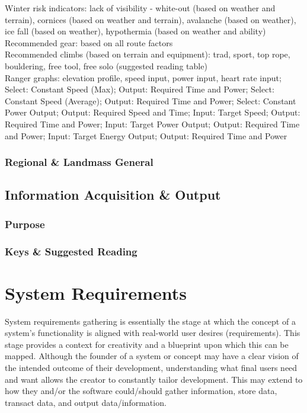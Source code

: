 \documentclass[11pt, english]{article}
\begin{document}
		Winter risk indicators: lack of visibility - white-out (based on weather and terrain), cornices (based on weather and terrain), avalanche (based on weather), ice fall (based on weather), hypothermia (based on weather and ability)\\

		Recommended gear: based on all route factors\\

		Recommended climbs (based on terrain and equipment): trad, sport, top rope, bouldering, free tool, free solo (suggested reading table)\\

		Ranger graphs: elevation profile, speed input, power input, heart rate input; Select: Constant Speed (Max); Output: Required Time and Power; Select: Constant Speed (Average); Output: Required Time and Power; Select: Constant Power Output; Output: Required Speed and Time; Input: Target Speed; Output: Required Time and Power; Input: Target Power Output; Output: Required Time and Power; Input: Target Energy Output; Output: Required Time and Power

		\subsubsection{Regional \& Landmass General}

	\subsection{Information Acquisition \& Output}

		\subsubsection{Purpose}

		\subsubsection{Keys \& Suggested Reading}

\newpage

\section{System Requirements}\label{ch4}

	System requirements gathering is essentially the stage at which the concept of a system's functionality is aligned with real-world user desires (requirements). This stage provides a context for creativity and a blueprint upon which this can be mapped. Although the founder of a system or concept may have a clear vision of the intended outcome of their development, understanding what final users need and want allows the creator to constantly tailor development. This may extend to how they and/or the software could/should gather information, store data, transact data, and output data/information.
\end{document}
